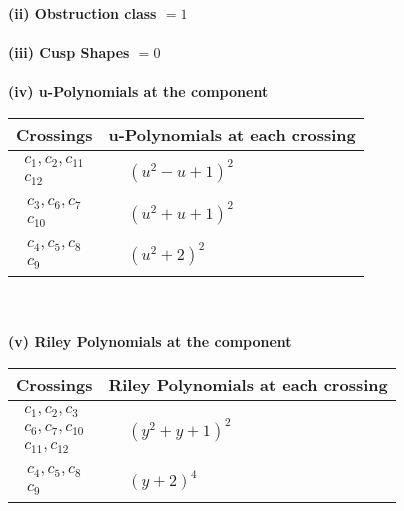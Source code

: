 \documentclass[1p]{elsarticle_modified}
\theoremstyle{definition}
\begin{document}
\flushleft \textbf{(ii) Obstruction class $= 1$}\\~\\
\flushleft \textbf{(iii) Cusp Shapes $= 0$}\\~\\
\newpage\renewcommand{\arraystretch}{1}
\flushleft \textbf{(iv) u-Polynomials at the component}\newline \\
\begin{tabular}{m{50pt}|m{274pt}}
Crossings & \hspace{64pt}u-Polynomials at each crossing \\
\hline $$\begin{aligned}c_{1},c_{2},c_{11}\\c_{12}\end{aligned}$$&$\begin{aligned}
&(u^2- u+1)^2
\end{aligned}$\\
\hline $$\begin{aligned}c_{3},c_{6},c_{7}\\c_{10}\end{aligned}$$&$\begin{aligned}
&(u^2+u+1)^2
\end{aligned}$\\
\hline $$\begin{aligned}c_{4},c_{5},c_{8}\\c_{9}\end{aligned}$$&$\begin{aligned}
&(u^2+2)^2
\end{aligned}$\\
\hline
\end{tabular}\\~\\
\newpage\renewcommand{\arraystretch}{1}
\flushleft \textbf{(v) Riley Polynomials at the component}\newline \\
\begin{tabular}{m{50pt}|m{274pt}}
Crossings & \hspace{64pt}Riley Polynomials at each crossing \\
\hline $$\begin{aligned}c_{1},c_{2},c_{3}\\c_{6},c_{7},c_{10}\\c_{11},c_{12}\end{aligned}$$&$\begin{aligned}
&(y^2+y+1)^2
\end{aligned}$\\
\hline $$\begin{aligned}c_{4},c_{5},c_{8}\\c_{9}\end{aligned}$$&$\begin{aligned}
&(y+2)^4
\end{aligned}$\\
\hline
\end{tabular}\\~\\
\end{document}

